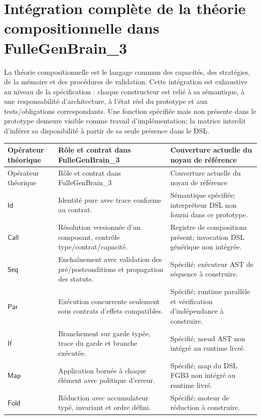 \section{Intégration complète de la théorie compositionnelle dans FulleGenBrain\_3}
La théorie compositionnelle est le langage commun des capacités, des stratégies, de la mémoire et des procédures de validation. Cette intégration est exhaustive au niveau de la spécification : chaque constructeur est relié à sa sémantique, à une responsabilité d'architecture, à l'état réel du prototype et aux tests/obligations correspondants. Une fonction spécifiée mais non présente dans le prototype demeure visible comme travail d'implémentation; la matrice interdit d'inférer sa disponibilité à partir de sa seule présence dans le DSL.

\begin{longtable}{p{}p{}p{}}
\toprule Opérateur théorique & Rôle et contrat dans FulleGenBrain\_3 & Couverture actuelle du noyau de référence \\
\midrule
\endfirsthead
\toprule Opérateur théorique & Rôle et contrat dans FulleGenBrain\_3 & Couverture actuelle du noyau de référence \\
\midrule
\endhead
\(\mathsf{Id}\) & Identité pure avec trace conforme au contrat. & Sémantique spécifiée; interpréteur DSL non fourni dans ce prototype. \\
\(\mathsf{Call}\) & Résolution versionnée d'un composant, contrôle type/contrat/capacité. & Registre de compositions présent; invocation DSL générique non intégrée. \\
\(\mathsf{Seq}\) & Enchaînement avec validation des pré/postconditions et propagation des statuts. & Spécifié; exécuteur AST de séquence à construire. \\
\(\mathsf{Par}\) & Exécution concurrente seulement sous contrats d'effets compatibles. & Spécifié; runtime parallèle et vérification d'indépendance à construire. \\
\(\mathsf{If}\) & Branchement sur garde typée, trace du garde et branche exécutée. & Spécifié; nœud AST non intégré au runtime livré. \\
\(\mathsf{Map}\) & Application bornée à chaque élément avec politique d'erreur. & Spécifié; map du DSL FGB3 non intégré au runtime livré. \\
\(\mathsf{Fold}\) & Réduction avec accumulateur typé, invariant et ordre défini. & Spécifié; moteur de réduction à construire. \\

\end{longtable}
